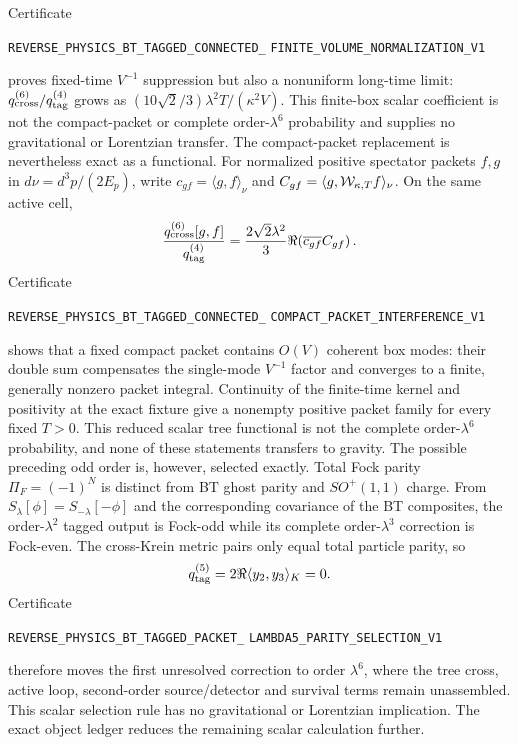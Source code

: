 \documentclass[11pt]{article}
\theoremstyle{definition}
\theoremstyle{remark}
\begin{document}
Certificate
\par\noindent
\texttt{REVERSE\_PHYSICS\_BT\_TAGGED\_CONNECTED\_}
\allowbreak\texttt{FINITE\_VOLUME\_NORMALIZATION\_V1}
\par\noindent
proves fixed-time $V^{-1}$ suppression but also a nonuniform long-time limit:
$q_{\rm cross}^{(6)}/q_{\rm tag}^{(4)}$ grows as
$(10\sqrt2/3)\lambda^2T/(\kappa^2V)$.  This finite-box scalar coefficient is
not the compact-packet or complete order-$\lambda^6$ probability and supplies
no gravitational or Lorentzian transfer.
The compact-packet replacement is nevertheless exact as a functional.  For
normalized positive spectator packets $f,g$ in
$d\nu=d^3p/(2E_p)$, write $c_{gf}=\langle g,f\rangle_\nu$ and
$C_{gf}=\langle g,{\cal W}_{\kappa,T}f\rangle_\nu$.  On the same active
cell,
\[
 \frac{q_{\rm cross}^{(6)}[g,f]}{q_{\rm tag}^{(4)}}
 =\frac{2\sqrt2\lambda^2}{3}
 \Re\!\left(\overline{c_{gf}}C_{gf}\right).
\]
Certificate
\par\noindent
\texttt{REVERSE\_PHYSICS\_BT\_TAGGED\_CONNECTED\_}
\allowbreak\texttt{COMPACT\_PACKET\_INTERFERENCE\_V1}
\par\noindent
shows that a fixed compact packet contains $O(V)$ coherent box modes: their
double sum compensates the single-mode $V^{-1}$ factor and converges to a
finite, generally nonzero packet integral.  Continuity of the finite-time
kernel and positivity at the exact fixture give a nonempty positive packet
family for every fixed $T>0$.  This reduced scalar tree functional is not the
complete order-$\lambda^6$ probability, and none of these statements
transfers to gravity.  The possible preceding odd order is, however, selected
exactly.  Total Fock parity $\Pi_F=(-1)^N$ is distinct from BT ghost parity
and $SO^+(1,1)$ charge.  From
$S_\lambda[\phi]=S_{-\lambda}[-\phi]$ and the corresponding covariance of the
BT composites, the order-$\lambda^2$ tagged output is Fock-odd while its
complete order-$\lambda^3$ correction is Fock-even.  The cross-Krein metric
pairs only equal total particle parity, so
\[
 q_{\rm tag}^{(5)}=2\Re\langle y_2,y_3\rangle_K=0.
\]
Certificate
\par\noindent
\texttt{REVERSE\_PHYSICS\_BT\_TAGGED\_PACKET\_}
\allowbreak\texttt{LAMBDA5\_PARITY\_SELECTION\_V1}
\par\noindent
therefore moves the first unresolved correction to order $\lambda^6$, where
the tree cross, active loop, second-order source/detector and survival terms
remain unassembled.  This scalar selection rule has no gravitational or
Lorentzian implication.
The exact object ledger reduces the remaining scalar calculation further.
\end{document}
